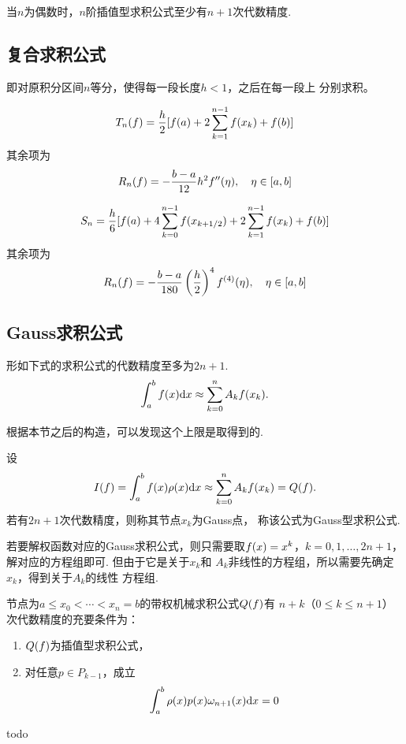   \begin{thm}[偶阶求积公式的代数精度]
    当$n$为偶数时，$n$阶插值型求积公式至少有$n+1$次代数精度.
  \end{thm}

\subsection{复合求积公式}
  即对原积分区间$n$等分，使得每一段长度$h<1$，之后在每一段上
  分别求积。

  \begin{thm}[复合梯形公式余项]
    \[
      T_n(\mathnormal{f}) = \frac{h}{2}[\mathnormal{f}(a) + 2\sum_{k=1}^{n-1}\mathnormal{f}(x_k) + \mathnormal{f}(b)]
    \]
    其余项为
    \[
      R_n(\mathnormal{f}) = -\frac{b-a}{12}h^2\mathnormal{f}^{\prime\prime}(\eta),\quad
      \eta\in[a, b]
    \]
  \end{thm}

  \begin{thm}[复合Simpson公式]
    \[
      S_n = \frac{h}{6}[\mathnormal{f}(a) + 4\sum_{k=0}^{n-1}\mathnormal{f}(x_{k+1/2})
      + 2\sum_{k=1}^{n-1}\mathnormal{f}(x_k) + \mathnormal{f}(b)]
    \]
    其余项为
    \[
      R_n(\mathnormal{f}) = -\frac{b-a}{180}\left(\frac{h}{2}\right)^4\mathnormal{f}^{(4)}(\eta),
      \quad\eta\in[a, b]
    \]
  \end{thm}

\subsection{Gauss求积公式}
  \begin{pos}[求积公式代数精度上限]
    形如下式的求积公式的代数精度至多为$2n+1$.
    \[
      \int_a^b\mathnormal{f}(x)\mathrm{d} x\approx \sum_{k=0}^nA_k\mathnormal{f}(x_k).
    \]
  \end{pos}
  \remark
    根据本节之后的构造，可以发现这个上限是取得到的.

  \begin{defi}[Gauss求积公式]
    设
    \begin{equation}
      \label{equ: 带权求积公式}
      I(\mathnormal{f}) = \int_a^b\mathnormal{f}(x)\rho(x)\mathrm{d} x \approx \sum_{k=0}^nA_k\mathnormal{f}(x_k) = Q(\mathnormal{f}).
    \end{equation}
    若有$2n+1$次代数精度，则称其节点$x_k$为Gauss点，
    称该公式为Gauss型求积公式.
  \end{defi}
  \remark
    若要解权函数对应的Gauss求积公式，则只需要取$\mathnormal{f}(x) = x^k$，$k=
    0,1,\dots, 2n+1$，解对应的方程组即可. 但由于它是关于$x_k$和
    $A_k$非线性的方程组，所以需要先确定$x_k$，得到关于$A_k$的线性
    方程组.

  \begin{thm}
    节点为$a \le x_0 < \cdots < x_n = b$的带权机械求积公式$Q(\mathnormal{f})$有
    $n+k$（$0\le k\le n+1$）次代数精度的充要条件为：
    \begin{enumerate}
      \item $Q(\mathnormal{f})$为插值型求积公式，
      \item 对任意$p\in P_{k-1}$，成立
      \[
        \int_a^b\rho(x)p(x)\omega_{n+1}(x)\mathrm{d} x = 0
      \]
    \end{enumerate}
  \end{thm}
  \proof
    todo


